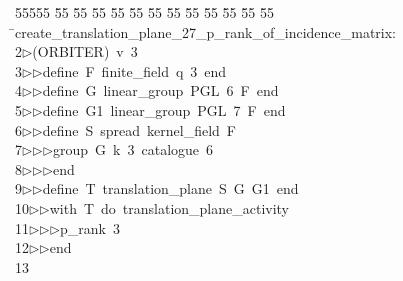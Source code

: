 %
%
\begin{tabbing}
55555 \= 55 \= 55 \= 55 \= 55 \= 55 \= 55 \= 55 \= 55 \= 55 \= 55 \= 55 \= 55 \= \>create\_translation\_plane\_27\_p\_rank\_of\_incidence\_matrix:\\[0pt]
2\>$\triangleright$\>(ORBITER)\ v\ 3\ \\[0pt]
3\>$\triangleright$\>$\triangleright$\>define\ F\ finite\_field\ q\ 3\ end\ \\[0pt]
4\>$\triangleright$\>$\triangleright$\>define\ G\ linear\_group\ PGL\ 6\ F\ end\ \\[0pt]
5\>$\triangleright$\>$\triangleright$\>define\ G1\ linear\_group\ PGL\ 7\ F\ end\ \\[0pt]
6\>$\triangleright$\>$\triangleright$\>define\ S\ spread\ kernel\_field\ F\ \\[0pt]
7\>$\triangleright$\>$\triangleright$\>$\triangleright$\>group\ G\ k\ 3\ catalogue\ 6\ \\[0pt]
8\>$\triangleright$\>$\triangleright$\>$\triangleright$\>end\ \\[0pt]
9\>$\triangleright$\>$\triangleright$\>define\ T\ translation\_plane\ S\ G\ G1\ end\ \\[0pt]
10\>$\triangleright$\>$\triangleright$\>with\ T\ do\ translation\_plane\_activity\ \\[0pt]
11\>$\triangleright$\>$\triangleright$\>$\triangleright$\>p\_rank\ 3\ \\[0pt]
12\>$\triangleright$\>$\triangleright$\>end\\[0pt]
13\>\end{tabbing}
